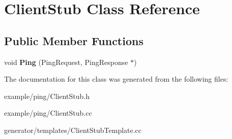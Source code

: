 \hypertarget{classClientStub}{}\section{Client\+Stub Class Reference}
\label{classClientStub}
\subsection*{Public Member Functions}
\begin{DoxyCompactItemize}
\item 
\mbox{\label{classClientStub_a423d4c727b14421503be1bc43780ee85}} 
void {\bfseries Ping} (Ping\+Request, Ping\+Response $\ast$)
\end{DoxyCompactItemize}


The documentation for this class was generated from the following files\+:\begin{DoxyCompactItemize}
\item 
example/ping/Client\+Stub.\+h\item 
example/ping/Client\+Stub.\+cc\item 
generator/templates/Client\+Stub\+Template.\+cc\end{DoxyCompactItemize}
